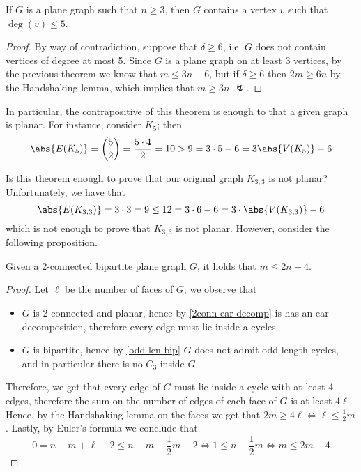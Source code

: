 \documentclass[a4paper, 12pt]{report}
\begin{document}
    \begin{framedcor}[label={5 deg planar}]{}
        If $G$ is a plane graph such that $n \ge 3$, then $G$ contains a vertex $v$ such that $\deg(v) \le 5$.
    \end{framedcor}

    \begin{proof}
        By way of contradiction, suppose that $\delta \ge 6$, i.e. $G$ does not contain vertices of degree at most 5. Since $G$ is a plane graph on at least 3 vertices, by the previous theorem we know that $m \le 3n - 6$, but if $\delta \ge 6$ then $2m \ge 6n$ by the Handshaking lemma, which implies that $m \ge 3n$ $\lightning$.
    \end{proof}

    In particular, the contrapositive of this theorem is enough to  that a given graph is  planar. For instance, consider $K_5$; then $$\abs{E(K_5)} = \binom{5}{2} = \dfrac{5 \cdot 4}{2} = 10 > 9 = 3 \cdot 5 - 6 = 3 \abs{V(K_5)} - 6$$

    Is this theorem enough to prove that our original graph $K_{3,3}$ is not planar? Unfortunately, we have that $$\abs{E(K_{3, 3})} = 3 \cdot 3 = 9 \le 12 = 3 \cdot 6 - 6 = 3 \cdot \abs{V(K_{3, 3})} - 6$$ which is not enough to prove that $K_{3,3}$ is not planar. However, consider the following proposition.

    \begin{framedprop}{}
        Given a 2-connected bipartite plane graph $G$, it holds that $m \le 2n - 4$.
    \end{framedprop}

    \begin{proof}
        Let $\ell$ be the number of faces of $G$; we observe that

        \begin{itemize}
            \item $G$ is 2-connected and planar, hence by \cref{2conn ear decomp} is has an ear decomposition, therefore every edge must lie inside a cycles
            \item $G$ is bipartite, hence by \cref{odd-len bip} $G$ does not admit odd-length cycles, and in particular there is no $C_3$ inside $G$
        \end{itemize}

        Therefore, we get that every edge of $G$ must lie inside a cycle with at least 4 edges, therefore the sum on the number of edges of each face of $G$ is at least $4 \ell$. Hence, by the Handshaking lemma on the faces we get that $2 m \ge 4 \ell \iff \ell \le \tfrac{1}{2}m$. Lastly, by Euler's formula we conclude that $$0 = n - m + \ell - 2 \le n - m + \dfrac{1}{2} m - 2 \iff 1 \le n - \dfrac{1}{2} m \iff m \le 2m - 4$$
    \end{proof}
\end{document}

